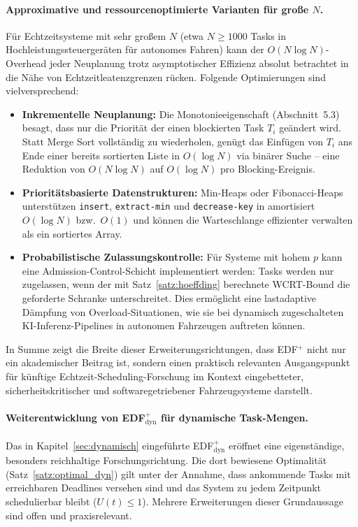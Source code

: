 ﻿\documentclass[a4paper,12pt]{article}
\theoremstyle{definition}
\begin{document}
	\paragraph{Approximative und ressourcenoptimierte Varianten für gro\ss{}e $N$.}
	Für Echtzeitsysteme mit sehr gro\ss{}em $N$ (etwa $N \ge 1000$ Tasks in
	Hochleistungssteuergeräten für autonomes Fahren) kann der $O(N \log N)$-Overhead
	jeder Neuplanung trotz asymptotischer Effizienz absolut betrachtet in die Nähe von
	Echtzeitleatenzgrenzen rücken. Folgende Optimierungen sind vielversprechend:
	\begin{itemize}
		\item \textbf{Inkrementelle Neuplanung:} Die Monotonieeigenschaft
		      (Abschnitt~5.3) besagt, dass nur die Priorität der einen
		      blockierten Task $T_i$ geändert wird. Statt Merge Sort vollständig zu
		      wiederholen, genügt das Einfügen von $T_i$ ans Ende einer bereits sortierten
		      Liste in $O(\log N)$ via binärer Suche -- eine Reduktion von $O(N \log N)$
		      auf $O(\log N)$ pro Blocking-Ereignis.
		\item \textbf{Prioritätsbasierte Datenstrukturen:} Min-Heaps oder
		      Fibonacci-Heaps unterstüt\-zen \texttt{insert}, \texttt{extract-min} und
		      \texttt{decrease-key} in amortisiert $O(\log N)$ bzw.\ $O(1)$ und können
		      die Warteschlange effizienter verwalten als ein sortiertes Array.
		\item \textbf{Probabilistische Zulassungskontrolle:} Für Systeme mit
		      hohem $p$ kann eine Admission-Control-Schicht implementiert werden: Tasks
		      werden nur zugelassen, wenn der mit Satz~\ref{satz:hoeffding} berechnete
		      WCRT-Bound die geforderte Schranke unterschreitet. Dies ermöglicht eine
		      lastadaptive Dämpfung von Overload-Situationen, wie sie bei dynamisch
		      zugeschalteten KI-Inferenz-Pipelines in autonomen Fahrzeugen auftreten können.
	\end{itemize}
	In Summe zeigt die Breite dieser Erweiterungsrichtungen, dass EDF$^+$ nicht nur ein
	akademischer Beitrag ist, sondern einen praktisch relevanten Ausgangspunkt für
	künftige Echtzeit-Scheduling-Forschung im Kontext eingebetteter, sicherheitskritischer
	und softwaregetriebener Fahrzeugsysteme darstellt.

	\paragraph{Weiterentwicklung von EDF$^+_{\mathrm{dyn}}$ für dynamische Task-Mengen.}
	Das in Kapitel~\ref{sec:dynamisch} eingeführte EDF$^+_{\mathrm{dyn}}$ eröffnet
	eine eigenständige, besonders reichhaltige Forschungsrichtung. Die dort bewiesene
	Optimalität (Satz~\ref{satz:optimal_dyn}) gilt unter der Annahme, dass ankommende
	Tasks mit erreichbaren Deadlines versehen sind und das System zu jedem Zeitpunkt
	schedulierbar bleibt ($U(t) \le 1$). Mehrere Erweiterungen dieser Grundaussage sind
	offen und praxisrelevant.
\end{document}
